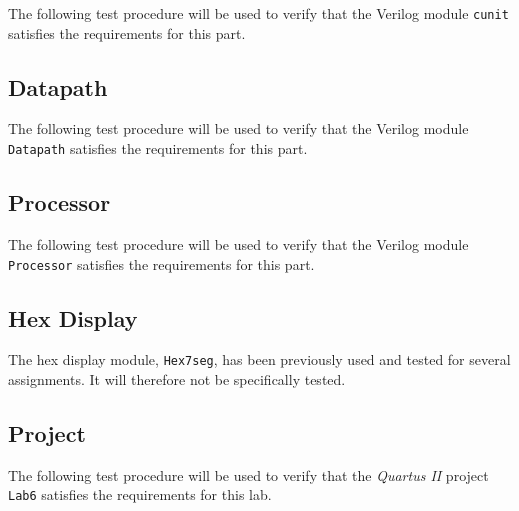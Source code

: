 The following test procedure will be used to verify that the Verilog module \verb|cunit| satisfies the requirements for this part.



\subsection{Datapath} %
\label{sub:datapath}

The following test procedure will be used to verify that the Verilog module \verb|Datapath| satisfies the requirements for this part.



\subsection{Processor} %
\label{sub:processor}

The following test procedure will be used to verify that the Verilog module \verb|Processor| satisfies the requirements for this part.



\subsection{Hex Display} %
\label{sub:hex_display}

The hex display module, \verb|Hex7seg|, has been previously used and tested for several assignments.
It will therefore not be specifically tested.

\subsection{Project} %
\label{sub:project}

The following test procedure will be used to verify that the \emph{Quartus II} project \verb|Lab6| satisfies the requirements for this lab.

